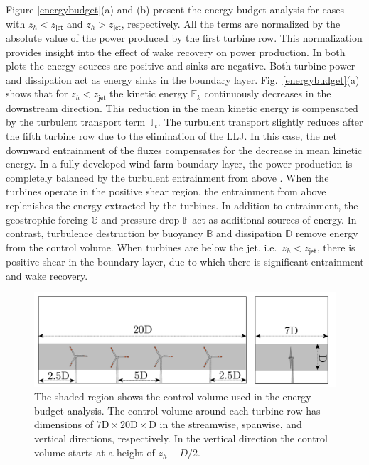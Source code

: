 \documentclass[%
 aip,
 amsmath,amssymb,
preprint,%
author-numerical,%
]{revtex4-1}
\begin{document}
Figure \ref{energybudget}(a) and (b) present the energy budget analysis for cases with $z_h < z_\mathsf{jet}$ and $z_h > z_\mathsf{jet}$, respectively. All the terms are normalized by the absolute value of the power produced by the first turbine row. This normalization provides insight into the effect of wake recovery on power production. In both plots the energy sources are positive and sinks are negative. Both turbine power and dissipation act as energy sinks in the boundary layer. Fig.\ \ref{energybudget}(a) shows that for $z_h < z_\mathsf{jet}$ the kinetic energy $\mathbb{E}_k$ continuously decreases in the downstream direction. This reduction in the mean kinetic energy is compensated by the turbulent transport term $\mathbb{T}_t$. The turbulent transport slightly reduces after the fifth turbine row due to the elimination of the LLJ. In this case, the net downward entrainment of the fluxes compensates for the decrease in mean kinetic energy. In a fully developed wind farm boundary layer, the power production is completely balanced by the turbulent entrainment from above \cite{cal10, cal10b}. When the turbines operate in the positive shear region, the entrainment from above replenishes the energy extracted by the turbines. In addition to entrainment, the geostrophic forcing $\mathbb{G}$ and pressure drop $\mathbb{F}$ act as additional sources of energy. In contrast, turbulence destruction by buoyancy $\mathbb{B}$ and dissipation $\mathbb{D}$ remove energy from the control volume. When turbines are below the jet, i.e.\ $z_h < z_\mathsf{jet}$, there is positive shear in the boundary layer, due to which there is significant entrainment and wake recovery.

\begin{figure}
 \centering
 \includegraphics[width=0.75\linewidth]{controlvolume}
 \vspace{-0.25cm}
 \caption{The shaded region shows the control volume used in the energy budget analysis. The control volume around each turbine row has dimensions of $7\text{D}\times{20\text{D}}\times{\text{D}}$ in the streamwise, spanwise, and vertical directions, respectively. In the vertical direction the control volume starts at a height of $z_h-D/2$.}
 \label{cv}
\end{figure}
\end{document}
